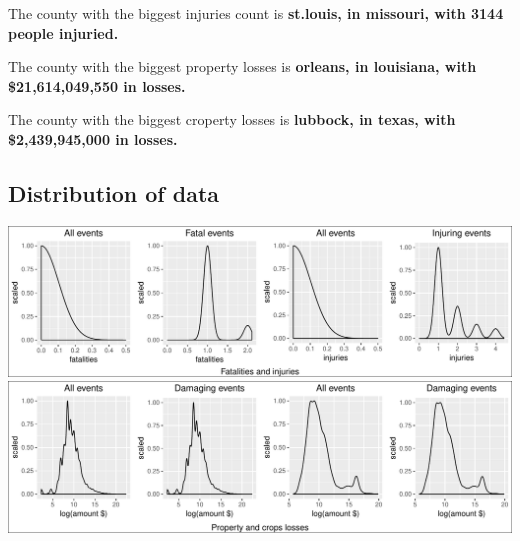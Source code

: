 \documentclass[]{article}
\begin{document}
The county with the biggest injuries count is \textbf{st.louis, in
missouri, with 3144 people injuried.}

The county with the biggest property losses is \textbf{orleans, in
louisiana, with \$21,614,049,550 in losses.}

The county with the biggest croperty losses is \textbf{lubbock, in
texas, with \$2,439,945,000 in losses.}

\subsection{Distribution of data}\label{distribution-of-data}

\includegraphics{readme_files/figure-latex/distribution-1.pdf}
\includegraphics{readme_files/figure-latex/distribution-2.pdf}
\end{document}
